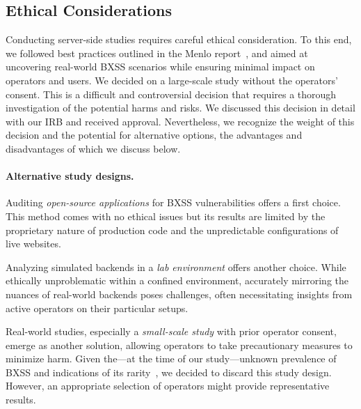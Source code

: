 \subsection{Ethical Considerations}\label{sec:ethical}
Conducting server-side studies requires careful ethical consideration.
To this end, we followed best practices outlined in the Menlo report~\cite{KenDit12}, and aimed at uncovering real-world BXSS scenarios while ensuring minimal impact on operators and users.
We decided on a large-scale study without the operators' consent. %
This is a difficult and controversial decision that requires a thorough investigation of the potential harms and risks.
We discussed this decision in detail with our IRB and received approval.
Nevertheless, we recognize the weight of this decision and the potential for alternative options, the advantages and disadvantages of which we discuss below.


\vspace{-1em}\paragraph{Alternative study designs.} %
Auditing \emph{open-source applications} for BXSS vulnerabilities offers a first choice. This method comes with no ethical issues but its results are limited by the proprietary nature of production code and the unpredictable configurations of live websites.

Analyzing simulated backends in a \emph{lab environment} offers another choice.
While ethically unproblematic within a confined environment, accurately mirroring the nuances of real-world backends poses challenges, often necessitating insights from active operators on their particular setups.


Real-world studies, especially a \emph{small-scale study} with prior operator consent, emerge as another solution, allowing operators to take precautionary measures to minimize harm.
Given the---at the time of our study---unknown prevalence of BXSS and indications of its rarity~\cite{eriksson2021black,doupe2010johnny,bau2010state,parvez2015analysis}, we decided to discard this study design.
However, an appropriate selection of operators might provide representative results.


